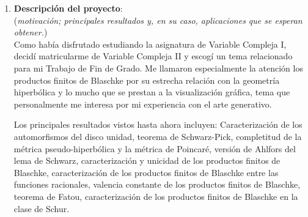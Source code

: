 \documentclass[a4paper,oneside,11pt,leqno]{article}
\begin{document}
\begin{enumerate}[label=\textbf{\arabic*.}]
\begin{itemize}
    \item \textbf{M\'etrica hiperb\'olica.} M\'etrica pseudo-hiperb\'olica en el disco unidad. Desigualdad triangular generalizada. M\'etrica de Poincar\'e en el disco unidad y en el semiplano superior. Longitud hiperb\'olica y su invariancia conforme. Versi\'on de Ahlfors del lema de Schwarz.
    
    \item \textbf{Productos finitos de Blaschke.} Definici\'on y primeras propiedades. Unicidad y no unicidad: teorema de Horowitz-Rubel. Productos finitos de Blaschke vistos como funciones racionales. Su derivada en la circunferencia unidad. Recubrimiento del plano extendido por los productos de Blaschke finitos. \'Algebra del disco, elementos unimodulares, teorema de Fatou para productos de Blaschke finitos. Valencia constante. Composici\'on de productos finitos de Blaschke.
\end{itemize}

\vskip 20pt
\hrule
\item {\bf Descripci\'on del proyecto}: \\
{\small (\textit{motivaci\'on; principales resultados y, en su caso, aplicaciones que se esperan obtener.})} \\

Como hab\'ia disfrutado estudiando la asignatura de Variable Compleja I, decid\'i matricularme de Variable Compleja II y escog\'i un tema relacionado para mi Trabajo de Fin de Grado. Me llamaron especialmente la atenci\'on los productos finitos de Blaschke por su estrecha relaci\'on con la geometr\'ia hiperb\'olica y lo mucho que se prestan a la visualizaci\'on gr\'afica, tema que personalmente me interesa por mi experiencia con el arte generativo.

Los principales resultados vistos hasta ahora incluyen: Caracterizaci\'on de los automorfismos del disco unidad, teorema de Schwarz-Pick, completitud de la m\'etrica pseudo-hiperb\'olica y la m\'etrica de Poincar\'e, versi\'on de Ahlfors del lema de Schwarz, caracterizaci\'on y unicidad de los productos finitos de Blaschke, caracterizaci\'on de los productos finitos de Blaschke entre las funciones racionales, valencia constante de los productos finitos de Blaschke, teorema de Fatou, caracterizaci\'on de los productos finitos de Blaschke en la clase de Schur.


\end{enumerate}
\end{document}
